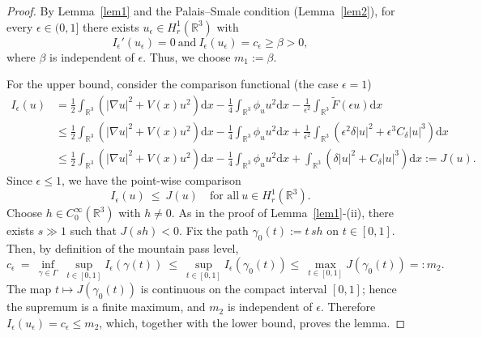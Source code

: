 \documentclass[12pt]{amsart}
\numberwithin{equation}{section}
\theoremstyle{definition}
\begin{document}
\begin{proof}
	By Lemma~\ref{lem1} and the Palais–Smale condition (Lemma~\ref{lem2}), for every \(\epsilon\in(0,1]\) there exists
	\(u_{\epsilon}\in H^{1}_{r}(\mathbb{R}^3)\) with
	\[
	I_{\epsilon}'(u_{\epsilon})=0~\text{and}~I_{\epsilon}(u_{\epsilon})=c_{\epsilon}\ge \beta>0,
	\]
	where \(\beta\) is independent of \(\epsilon\). Thus, we choose \(m_{1}:=\beta\).
	
	For the upper bound, consider the comparison functional (the case \(\epsilon=1\))
\begin{equation*}
			\begin{aligned}
	\text{$I_{\epsilon}(u)$}&=\frac{1}{2}\int_{\mathbb R^3}\left(|\nabla u|^2+V(x)u^2\right)\text{d}x-\frac{1}{4}\int_{\mathbb R^3}\phi_{u} u^2\text{d}x-\frac{1}{\epsilon^2}\int_{\mathbb R^3}\tilde F(\epsilon u)\text{d}x\\
    &\leq \frac{1}{2}\int_{\mathbb R^3}\left(|\nabla u|^2+V(x)u^2\right)\text{d}x-\frac{1}{4}\int_{\mathbb R^3}\phi_{u} u^2\text{d}x+\frac{1}{\epsilon^2}\int_{\mathbb R^3}\left(\epsilon^2\delta |u|^2+\epsilon^3 C_\delta |u|^3\right)\text{d}x\\
    &\leq \frac{1}{2}\int_{\mathbb R^3}\left(|\nabla u|^2+V(x)u^2\right)\text{d}x-\frac{1}{4}\int_{\mathbb R^3}\phi_{u} u^2\text{d}x+\int_{\mathbb R^3}\left(\delta |u|^2+C_\delta |u|^3\right)\text{d}x:=J(u).
	\end{aligned}
		\end{equation*}
	Since \(\epsilon\le 1\), we have the point-wise comparison
	\begin{equation*}
		I_{\epsilon}(u)\ \le\ J(u)\quad\text{for~all}~u\in H^{1}_{r}(\mathbb{R}^3).
	\end{equation*}
	Choose \(h\in C_{0}^{\infty}(\mathbb{R}^{3})\) with \(h\neq0\).
	As in the proof of Lemma~\ref{lem1}-(ii), there exists \(s\gg1\) such that \(J(sh)<0\).
	Fix the path \(\gamma_{0}(t):=t\,sh\) on \(t\in[0,1]\).
	Then, by definition of the mountain pass level,
	\[
	c_{\epsilon}\ =\ \inf_{\gamma\in\Gamma}\;\sup_{t\in[0,1]} I_{\epsilon}(\gamma(t))
	\ \le\ \sup_{t\in[0,1]} I_{\epsilon}(\gamma_{0}(t))
\le\ \max_{t\in[0,1]} J(\gamma_{0}(t))=:m_{2}.
	\]
	The map \(t\mapsto J(\gamma_{0}(t))\) is continuous on the compact interval \([0,1]\); hence the supremum is a finite maximum, and \(m_{2}\) is independent of \(\epsilon\).
	Therefore \(I_{\epsilon}(u_{\epsilon})=c_{\epsilon}\le m_{2}\), which, together with the lower bound, proves the lemma.
\end{proof}
\end{document}
